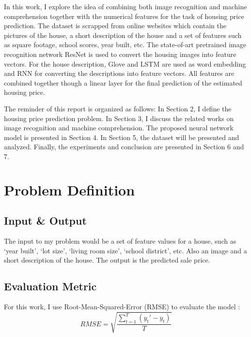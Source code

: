 \documentclass{article} %
\begin{document}
In this work, I explore the idea of combining both image recognition and machine comprehension together with the numerical features for the task of housing price prediction.
The dataset is scrapped from online websites which contain 
the pictures of the house, a short description of the house
and a set of features such as square footage, school scores, year built, etc.
The state-of-art pretrained image recognition network ResNet \cite{he2016deep}
is used to convert the housing images into feature vectors.
For the house description, Glove \cite{pennington2014glove} and LSTM \cite{hochreiter1997long} 
are used as word embedding and RNN for converting the descriptions into feature vectors.
All features are combined together though a linear layer for the final
prediction of the estimated housing price.

The reminder of this report is organized as follows:
In Section 2, I define the housing price prediction problem.
In Section 3, I discuss the related works on image recognition and machine comprehension.
The proposed neural network model is presented in Section 4.
In Section 5, the dataset will be presented and analyzed.
Finally, the experiments and conclusion are presented in Section 6 and 7.

\section{Problem Definition}

\subsection{Input \& Output}

The input to my problem would be a set of feature values for a house,
such as `year built', `lot size', `living room size', `school district', etc.
Also an image and a short description of the house.
The output is the predicted sale price.

%
%

\subsection{Evaluation Metric}

For this work, I use Root-Mean-Squared-Error (RMSE) to evaluate the model \cite{rmse}:
\begin{equation*}
	RMSE = \sqrt{\frac{\sum_{t=1}^{T}(y_t' - y_t)}{T}}
\end{equation*}
\end{document}
